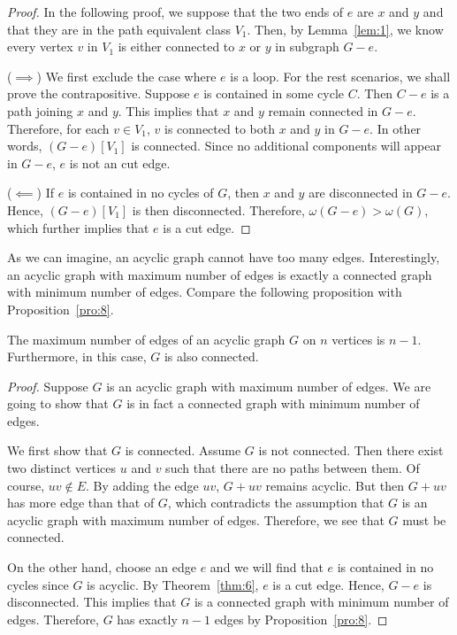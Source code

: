 \documentclass[thmcnt=section, 12pt, color=cyan]{my-elegantbook}
\begin{document}
\begin{proof}
	In the following proof, we suppose that the two ends of $e$
	are $x$ and $y$ and that they are in the 
	path equivalent class $V_1$.
	Then, by Lemma~\ref{lem:1}, 
	we know every vertex $v$ in $V_1$
	is either connected to $x$ or $y$ in subgraph $G-e$.

	($\implies$) We first exclude the case where $e$ is a loop.
	For the rest scenarios, 
	we shall prove the contrapositive.
	Suppose $e$ is contained in some cycle $C$.
	Then $C-e$ is a path joining $x$ and $y$.
	This implies that $x$ and $y$ remain connected in $G-e$.
	Therefore, for each $v \in V_1$, 
	$v$ is connected to both $x$ and $y$ in $G-e$.
	In other words, $(G-e)[V_1]$ is connected. 
	Since no additional components will appear in $G-e$,
	$e$ is not an cut edge.

	($\impliedby$) If $e$ is contained in no cycles of $G$, 
	then $x$ and $y$ are disconnected in $G-e$.
	Hence, $(G-e)[V_1]$ is then disconnected.
	Therefore, $\omega(G-e) > \omega(G)$, 
	which further implies that $e$ is a cut edge.
\end{proof}


As we can imagine, an acyclic graph cannot have too many edges.
Interestingly, an acyclic graph with maximum number of 
edges is exactly a connected graph with minimum number of edges.
Compare the following proposition with Proposition~\ref{pro:8}.

\begin{proposition} \label{pro:9}
	The maximum number of edges of 
	an acyclic graph $G$ on $n$ vertices 
	is $n-1$.
	Furthermore,
	in this case, 
	$G$ is also connected.
\end{proposition}

\begin{proof}
	Suppose $G$ is an acyclic graph with maximum number of edges.
	We are going to show that $G$ is in fact
	a connected graph with minimum number of edges.

	We first show that $G$ is connected.
	Assume $G$ is not connected.
	Then there exist two distinct vertices $u$ and $v$
	such that there are no paths between them.
	Of course, $uv \notin E$. 
	By adding the edge $uv$, 
	$G + uv$ remains acyclic. 
	But then $G + uv$ has more edge than that of $G$,
	which contradicts the assumption that 
	$G$ is an acyclic graph with maximum number of edges.
	Therefore, we see that $G$ must be connected.

	On the other hand, choose an edge $e$ and we will find
	that $e$ is contained in no cycles 
	since $G$ is acyclic.
	By Theorem~\ref{thm:6}, $e$ is a cut edge.
	Hence, $G-e$ is disconnected.
	This implies that $G$ is a connected graph 
	with minimum number of edges.
	Therefore, $G$ has exactly $n-1$ edges by Proposition~\ref{pro:8}.
\end{proof}
\end{document}
